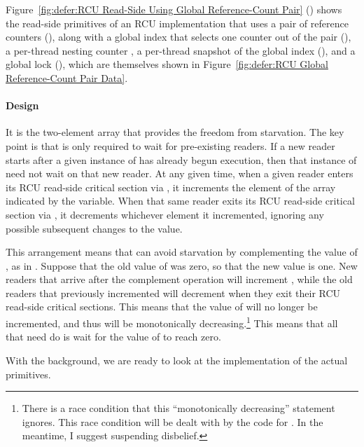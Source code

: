 Figure~\ref{fig:defer:RCU Read-Side Using Global Reference-Count Pair}
()
shows the read-side primitives of an RCU implementation that uses a pair
of reference counters (),
along with a global index that
selects one counter out of the pair (),
a per-thread nesting counter ,
a per-thread snapshot of the global index (),
and a global lock (),
which are themselves shown in
Figure~\ref{fig:defer:RCU Global Reference-Count Pair Data}.

\paragraph{Design}

It is the two-element  array that provides the freedom
from starvation.
The key point is that  is only required to wait
for pre-existing readers.
If a new reader starts after a given instance of 
has already begun execution, then that instance of 
need not wait on that new reader.
At any given time, when a given reader enters its RCU read-side critical
section via ,
it increments the element of the  array indicated by
the  variable.
When that same reader exits its RCU read-side critical section via
, it decrements whichever element it incremented,
ignoring any possible subsequent changes to the  value.

This arrangement means that  can avoid starvation
by complementing the value of , as in .
Suppose that the old value of  was zero, so that the new
value is one.
New readers that arrive after the complement operation will increment
, while the old readers that previously incremented
 will decrement  when they exit their
RCU read-side critical sections.
This means that the value of  will no longer be incremented,
and thus will be monotonically decreasing.\footnote{
	There is a race condition that this ``monotonically decreasing''
	statement ignores.
	This race condition will be dealt with by the code for
	.
	In the meantime, I suggest suspending disbelief.}
This means that all that  need do is wait for the
value of  to reach zero.

With the background, we are ready to look at the implementation of the
actual primitives.

